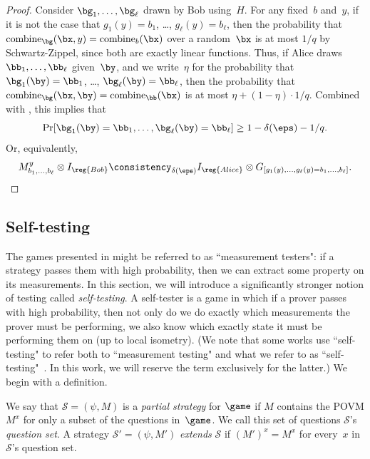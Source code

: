 \begin{proof}
Consider $\bg_1, \ldots, \bg_\ell$ drawn by Bob using~$H$.
For any fixed~$b$ and~$y$, if it is not the case that $g_1(y) = b_1$, \ldots, $g_\ell(y) = b_\ell$,
then the probability that $\mathrm{combine}_{\bg}(\bx, y) = \mathrm{combine}_{b}(\bx)$
over a random~$\bx$ is at most $1/q$ by Schwartz-Zippel, since both are exactly linear functions.
Thus, if Alice draws~$\bb_1, \ldots, \bb_\ell$ given~$\by$,
and we write~$\eta$ for the probability that $\bg_1(\by) = \bb_1$, \ldots, $\bg_\ell(\by) = \bb_\ell$,
then the probability that $\mathrm{combine}_{\bg}(\bx, \by) = \mathrm{combine}_{\bb}(\bx)$ is at most
$\eta +  (1-\eta) \cdot 1/q$.
Combined with , this implies that
\begin{equation*}
\Pr[\bg_1(\by) = \bb_1, \ldots, \bg_\ell(\by) = \bb_\ell] \geq 1- \delta(\eps) - 1/q.
\end{equation*}
Or, equivalently,
\begin{equation*}
M^y_{b_1, \ldots, b_\ell} \otimes I_{\reg{Bob}}
\consistency_{\delta(\eps)} I_{\reg{Alice}} \otimes G_{[g_1(y), \ldots, g_\ell(y) = b_1, \ldots, b_\ell]}.\qedhere
\end{equation*}
\end{proof}

\subsection{Self-testing}

The games presented in  might be referred to as ``measurement testers":
if a strategy passes them with high probability, then we can extract some property on its measurements.
In this section, we will introduce a significantly stronger notion of testing called \emph{self-testing}.
A self-tester is a game in which if a prover passes with high probability,
then not only do we do exactly which measurements the prover must be performing,
we also know which exactly state it must be performing them on (up to local isometry).
(We note that some works use ``self-testing" to refer both to ``measurement testing" and what we refer to as ``self-testing"~\cite{NV18a}.
In this work, we will reserve the term exclusively for the latter.) We begin with a definition.

\begin{definition}
We say that $\mathcal{S} = (\psi, M)$ is a \emph{partial strategy} for $\game$
if $M$ contains the POVM $M^x$ for only a subset of the questions in~$\game$.
We call this set of questions $\mathcal{S}$'s \emph{question set}.
A strategy $\mathcal{S}' = (\psi, M')$ \emph{extends} $\mathcal{S}$ if $(M')^x = M^x$ for every~$x$ in $\mathcal{S}$'s question set.
\end{definition}

